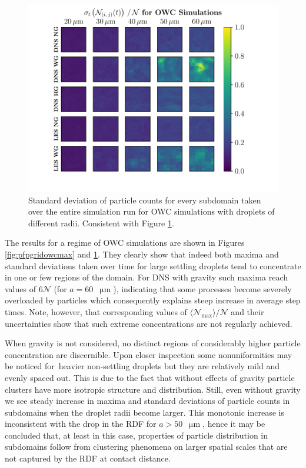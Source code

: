 \documentclass{pracamgren}
\begin{document}
\begin{figure}[!h]
\centering
\includegraphics[width=13.5cm]{img/plots/3-4g-pfpgridowcstd.pdf}
\caption{
Standard deviation of particle counts for every subdomain taken over the entire simulation run for OWC simulations with droplets of different radii.
Consistent with Figure \ref{fig:pfpgridowcstd}.
}
\label{fig:pfpgridowcstd}
\end{figure}

The results for a regime of OWC simulations are shown in Figures \ref{fig:pfpgridowcmax} and \ref{fig:pfpgridowcstd}.
They clearly show that indeed both maxima and standard deviations taken over time for large settling droplets tend to concentrate in one or few regions of the domain.
For DNS with gravity such maxima reach values of $6 \mathcal{N}$ (for $a = 60$~$\upmu\text{m}$), indicating that some processes become severely overloaded by particles which consequently explains steep increase in average step times.
Note, however, that corresponding values of $\langle \mathcal{N}_{\max} \rangle / \mathcal{N}$ and their uncertainties show that such extreme concentrations are not regularly achieved.

When gravity is not considered, no distinct regions of considerably higher particle concentration are discernible.
Upon closer inspection some nonuniformities may be noticed for~heavier non-settling droplets but they are relatively mild and evenly spaced out.
This is due to the fact that without effects of gravity particle clusters have more isotropic structure and distribution.
Still, even without gravity we see steady increase in maxima and standard deviations of particle counts in subdomains when the droplet radii become larger.
This monotonic increase is inconsistent with the drop in the RDF for $a > 50$~$\upmu\text{m}$, hence it may be concluded that, at least in this case, properties of particle distribution in subdomains follow from clustering phenomena on larger spatial scales that are not captured by the RDF at contact distance. 
\end{document}

